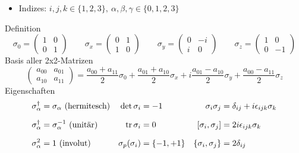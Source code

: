 \begin{itemize}
    \item Indizes: $i,j,k\in\{1, 2, 3\}, \ \alpha,\beta,\gamma\in\{0,1,2,3\}$ \begin{refsection}\end{refsection}
\end{itemize}
Definition \cite[Glg. 2.31, S.52]{qm}
\begin{equation*}
	\sigma_0=\begin{pmatrix} 1 & 0 \\ 0 & 1 \end{pmatrix} \qquad \sigma_x=\begin{pmatrix} 0 & 1 \\ 1 & 0 \end{pmatrix} \qquad \sigma_y=\begin{pmatrix} 0 & -i \\ i & 0 \end{pmatrix} \qquad \sigma_z=\begin{pmatrix}1 & 0 \\ 0 & -1 \end{pmatrix}
\end{equation*}
Basis aller 2x2-Matrizen \cite[Übung]{qm}
\begin{equation*}
	\begin{pmatrix} a_{00} & a_{01} \\ a_{10} & a_{11} \end{pmatrix} = \frac{a_{00}+a_{11}}{2}\sigma_0 + \frac{a_{01}+a_{10}}{2}\sigma_x + i\frac{a_{01}-a_{10}}{2}\sigma_y + \frac{a_{00}-a_{11}}{2}\sigma_z
\end{equation*}
Eigenschaften \cite[Glg. 2.32]{qm}
\begin{align*}
        \sigma_\alpha^\dagger &= \sigma_\alpha \ \text{(hermitesch)}  & \det\sigma_i       &= -1         & \sigma_i\sigma_j &= \delta_{ij} + i\epsilon_{ijk}\sigma_k \\[6pt]
        \sigma_\alpha^\dagger &= \sigma_\alpha^{-1} \ \text{(unitär)} & \tr\sigma_i        &= 0          & [\sigma_i, \sigma_j] &= 2i\epsilon_{ijk}\sigma_k \\[6pt]
        \sigma_\alpha^2 &= 1 \ \text{(involut)}                       & \sigma_p(\sigma_i) &= \{-1, +1\} & \{\sigma_i, \sigma_j\} &= 2\delta_{ij}
\end{align*}
